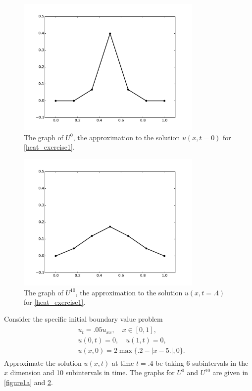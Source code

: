 \begin{figure}[ht]
\centering
\includegraphics[width=9cm]{heatexercise1a.pdf}
\caption{The graph of $U^{0}$, the approximation to the solution $u(x,t=0)$ for \ref{heat_exercise1}.}
\label{figure1a}
\end{figure}

\begin{figure}[ht]
\centering
\includegraphics[width=9cm]{heatexercise1b.pdf}
\caption{The graph of $U^{10}$, the approximation to the solution $u(x,t=.4)$ for \ref{heat_exercise1}.}
\label{figure1b}
\end{figure}


\begin{problem}
	Consider the specific initial boundary value problem
	\begin{align}
		\begin{split}
		&{ } u_t = .05 u_{xx}, \quad x \in [0,1], \\
		&{ } u(0,t) = 0,\quad u(1,t) = 0,\\
		&{ } u(x,0) = 2\max\{.2 - |x-5.|,0\}.
		\end{split}\label{heat_exercise1}
	\end{align}
	Approximate the solution $u(x,t)$ at time $t = .4$ be taking 6 subintervals in the $x$ dimension and 10 subintervals in time. 
	The graphs for $U^0$ and $U^{10}$ are given in \eqref{figure1a} and \ref{figure1b}.
\end{problem}



